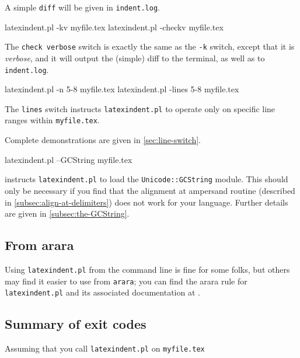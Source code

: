 A simple \texttt{diff} will be given in \texttt{indent.log}.


 \begin{commandshell}
latexindent.pl -kv myfile.tex
latexindent.pl -checkv myfile.tex
\end{commandshell}

  The \texttt{check verbose}
 switch is exactly the same as the \texttt{-k} switch, except that it is \emph{verbose},
 and it will output the (simple) diff to the terminal, as well as to \texttt{indent.log}.


 \begin{commandshell}
latexindent.pl -n 5-8 myfile.tex
latexindent.pl -lines 5-8 myfile.tex
\end{commandshell}

  The \texttt{lines} switch instructs
 \texttt{latexindent.pl} to operate only on specific line ranges within
 \texttt{myfile.tex}.

 Complete demonstrations are given in \cref{sec:line-switch}.


 \begin{commandshell}
latexindent.pl --GCString myfile.tex
\end{commandshell}

  instructs \texttt{latexindent.pl} to load the
 \texttt{Unicode::GCString} module. This should only be necessary if you find that the
 alignment at ampersand routine (described in \cref{subsec:align-at-delimiters}) does not
 work for your language. Further details are given in \cref{subsec:the-GCString}.

\subsection{From arara}\label{sec:arara}
 Using \texttt{latexindent.pl} from the command line is fine for some folks, but others
 may find it easier to use from \texttt{arara}; you can find the arara rule for
 \texttt{latexindent.pl} and its associated documentation at \cite{paulo}.

\subsection{Summary of exit codes}
 Assuming that you call \texttt{latexindent.pl} on \texttt{myfile.tex}

